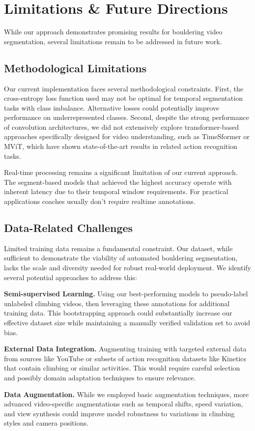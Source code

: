 \section{Limitations \& Future Directions}

While our approach demonstrates promising results for bouldering video segmentation, several limitations remain to be addressed in future work.

\subsection*{Methodological Limitations}
Our current implementation faces several methodological constraints. First, the cross-entropy loss function used may not be optimal for temporal segmentation tasks with class imbalance. Alternative losses could potentially improve performance on underrepresented classes. Second, despite the strong performance of convolution architectures, we did not extensively explore transformer-based approaches specifically designed for video understanding, such as TimeSformer or MViT, which have shown state-of-the-art results in related action recognition tasks.

Real-time processing remains a significant limitation of our current approach. The segment-based models that achieved the highest accuracy operate with inherent latency due to their temporal window requirements. For practical applications coaches usually don't require realtime annotations.

\subsection*{Data-Related Challenges}
Limited training data remains a fundamental constraint. Our dataset, while sufficient to demonstrate the viability of automated bouldering segmentation, lacks the scale and diversity needed for robust real-world deployment. We identify several potential approaches to address this:

\noindent\textbf{Semi-supervised Learning.}
Using our best-performing models to pseudo-label unlabeled climbing videos, then leveraging these annotations for additional training data. This bootstrapping approach could substantially increase our effective dataset size while maintaining a manually verified validation set to avoid bias.

\noindent\textbf{External Data Integration.}
Augmenting training with targeted external data from sources like YouTube or subsets of action recognition datasets like Kinetics that contain climbing or similar activities. This would require careful selection and possibly domain adaptation techniques to ensure relevance.

\noindent\textbf{Data Augmentation.}
While we employed basic augmentation techniques, more advanced video-specific augmentations such as temporal shifts, speed variation, and view synthesis could improve model robustness to variations in climbing styles and camera positions.